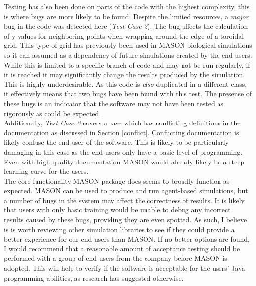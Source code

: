 \documentclass[11pt]{article}
\begin{document}
Testing has also been done on parts of the code with the highest complexity, this is where bugs are more likely to be found.
Despite the limited resources, a \textit{major} bug in the code was detected here (\textit{Test Case 2}).
The bug affects the calculation of y values for neighboring points when wrapping around the edge of a toroidal grid.
This type of grid has previously been used in MASON biological simulations\cite{ppsim} so it can assumed as a dependency of future simulations created by the end users.
While this is limited to a specific branch of code and may not be run regularly, if it is reached it may significantly change the results produced by the simulation.
This is highly underdesirable.
As this code is \textit{also} duplicated in a different class, it effectively means that two bugs have been found with this test.
The presense of these bugs is an indicator that the software may not have been tested as rigorously as could be expected.
\\

Additionally, \textit{Test Case 8} covers a case which has conflicting definitions in the documentation as discussed in Section \ref{conflict}.
Conflicting documentation is likely confuse the end-user of the software.
This is likely to be particularly damaging in this case as the end-users only have a basic level of programming.
Even with high-quality documentation MASON would already likely be a steep learning curve for the users.
\\

The core functionality MASON package does seems to broadly function as expected.
MASON can be used to produce and run agent-based simulations, but a number of bugs in the system may affect the correctness of results.
It is likely that users with only basic training would be unable to debug any incorrect results caused by these bugs, providing they are even spotted.
As such, I believe is is worth reviewing other simulation libraries to see if they could provide a better experience for our end users than MASON.
If no better options are found, I would recommend that a reasonable amount of acceptance testing should be performed with a group of end users from the company before MASON is adopted.
This will help to verify if the software is acceptable for the users' Java programming abilities, as research\cite{mason_doc, abm_platforms_review} has suggested otherwise.
\end{document}
